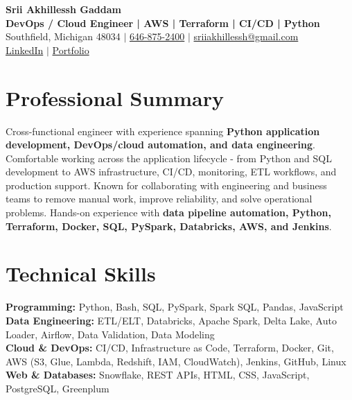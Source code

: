 \documentclass[letterpaper,10pt]{article}
\begin{document}
\fontsize{9.35pt}{10.45pt}\selectfont

\begin{center}
    {\LARGE \textbf{Srii Akhillessh Gaddam}} \\[-1pt]
    \textbf{DevOps / Cloud Engineer | AWS | Terraform | CI/CD | Python} \\[2pt]
    Southfield, Michigan 48034 $|$
    \href{tel:6468752400}{646-875-2400} $|$
    \href{mailto:sriiakhillessh@gmail.com}{sriiakhillessh@gmail.com} \\[1pt]
    \href{https://www.linkedin.com/in/srii-akhiilessh-gaddam-b48668191/}{LinkedIn} $|$
    \href{https://sriiakhillesshg.github.io/portfolio/}{Portfolio}
\end{center}
\vspace{-8pt}

\section{Professional Summary}
\small{Cross-functional engineer with experience spanning \textbf{Python application development, DevOps/cloud automation, and data engineering}. Comfortable working across the application lifecycle - from Python and SQL development to AWS infrastructure, CI/CD, monitoring, ETL workflows, and production support. Known for collaborating with engineering and business teams to remove manual work, improve reliability, and solve operational problems. Hands-on experience with \textbf{data pipeline automation, Python, Terraform, Docker, SQL, PySpark, Databricks, AWS, and Jenkins}.}

\section{Technical Skills}
\small{
\textbf{Programming:} Python, Bash, SQL, PySpark, Spark SQL, Pandas, JavaScript \\
\textbf{Data Engineering:} ETL/ELT, Databricks, Apache Spark, Delta Lake, Auto Loader, Airflow, Data Validation, Data Modeling \\
\textbf{Cloud \& DevOps:} CI/CD, Infrastructure as Code, Terraform, Docker, Git, AWS (S3, Glue, Lambda, Redshift, IAM, CloudWatch), Jenkins, GitHub, Linux \\
\textbf{Web \& Databases:} Snowflake, REST APIs, HTML, CSS, JavaScript, PostgreSQL, Greenplum
}
\end{document}
